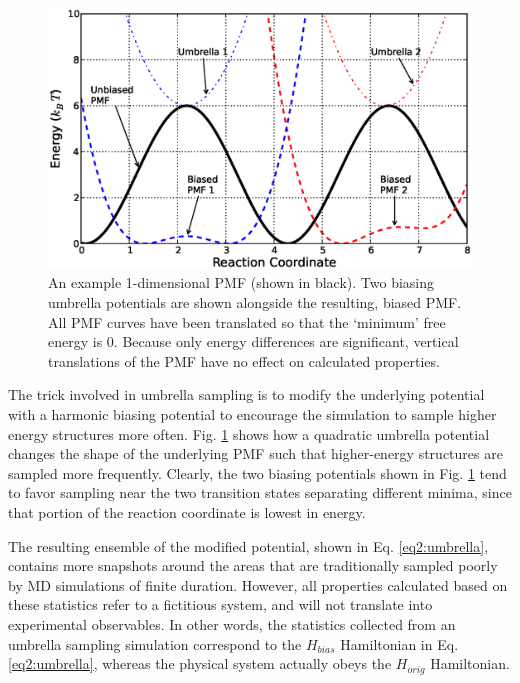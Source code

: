 \begin{figure}
   \includegraphics[width=6.5in]{FreeEnergyProfile.ps}
   \caption[An example 1-dimensional PMF (shown in black). Two biasing umbrella
            potentials are shown alongside the resulting, biased PMF. All PMF]
           {An example 1-dimensional PMF (shown in black). Two biasing umbrella
            potentials are shown alongside the resulting, biased PMF. All PMF
            curves have been translated so that the `minimum' free energy is 0.
            Because only energy differences are significant, vertical
            translations of the PMF have no effect on calculated properties.}
   \label{fig2:FreeEnergyProfile}
\end{figure}

The trick involved in umbrella sampling is to modify the underlying potential
with a harmonic biasing potential to encourage the simulation to sample higher
energy structures more often. Fig. \ref{fig2:FreeEnergyProfile} shows how a
quadratic umbrella potential changes the shape of the underlying PMF such that
higher-energy structures are sampled more frequently. Clearly, the two biasing
potentials shown in Fig. \ref{fig2:FreeEnergyProfile} tend to favor sampling
near the two transition states separating different minima, since that portion
of the reaction coordinate is lowest in energy.

The resulting ensemble of the modified potential, shown in Eq.
\ref{eq2:umbrella}, contains more snapshots around the areas that are
traditionally sampled poorly by MD simulations of finite duration. However, all
properties calculated based on these statistics refer to a fictitious system,
and will not translate into experimental observables. In other words, the
statistics collected from an umbrella sampling simulation correspond to the
$H_{bias}$ Hamiltonian in Eq. \ref{eq2:umbrella}, whereas the physical system
actually obeys the $H_{orig}$ Hamiltonian. \cite{Leach_Book_MolModel_2001}

